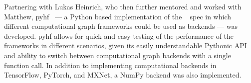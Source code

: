 Partnering with Lukas Heinrich, who then further mentored and worked with Matthew, pyhf~\cite{lukas_heinrich_2018_1172961} --- a Python based implementation of the ~\cite{Cranmer:2012sba} spec in which different computational graph frameworks could be used as backends --- was developed.
pyhf allows for quick and easy testing of the performance of the frameworks in different scenarios, given its easily understandable Pythonic API and ability to switch between computational graph backends with a single function call.
In addition to implementing computational backends in TensorFlow, PyTorch, and MXNet, a NumPy backend was also implemented.\\

